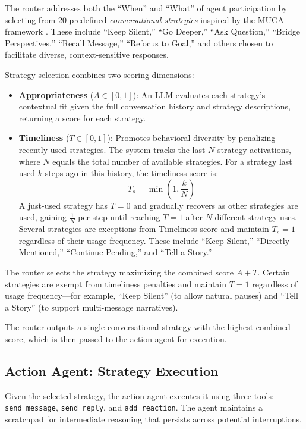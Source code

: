 \documentclass[twocolumn,10pt]{article}
\begin{document}
The router addresses both the ``When'' and ``What'' of agent participation by selecting from 20 predefined \textit{conversational strategies} inspired by the MUCA framework \cite{mao2024muca}. These include ``Keep Silent,'' ``Go Deeper,'' ``Ask Question,'' ``Bridge Perspectives,'' ``Recall Message,'' ``Refocus to Goal,'' and others chosen to facilitate diverse, context-sensitive responses.

Strategy selection combines two scoring dimensions:
\begin{itemize}
\item \textbf{Appropriateness} ($A \in [0,1]$): An LLM evaluates each strategy's contextual fit given the full conversation history and strategy descriptions, returning a score for each strategy.

\item \textbf{Timeliness} ($T \in [0,1]$): Promotes behavioral diversity by penalizing recently-used strategies. The system tracks the last $N$ strategy activations, where $N$ equals the total number of available strategies. For a
strategy last used $k$ steps ago in this history, the timeliness score is:
$$T_s = \min\left(1, \frac{k}{N}\right)$$
A just-used strategy has $T=0$ and gradually recovers as other strategies are used, gaining $\frac{1}{N}$ per step until reaching $T=1$ after $N$ different strategy uses.
Several strategies are exceptions from Timeliness score and maintain $T_s = 1$ regardless of their usage frequency. These include ``Keep Silent,'' ``Directly Mentioned,'' ``Continue Pending,'' and ``Tell a Story.''

\end{itemize}

The router selects the strategy maximizing the combined score $A + T$. Certain strategies are exempt from timeliness penalties and maintain $T = 1$ regardless of usage frequency—for example, ``Keep Silent'' (to allow natural pauses) and ``Tell a Story'' (to support multi-message narratives).

The router outputs a single conversational strategy with the highest combined score, which is then passed to the action agent for execution.

\subsection{Action Agent: Strategy Execution}
\label{subsec:action-agent}

Given the selected strategy, the action agent executes it using three tools: \texttt{send\_message}, \texttt{send\_reply}, and \texttt{add\_reaction}. The agent maintains a scratchpad for intermediate reasoning that persists across potential interruptions.
\end{document}
